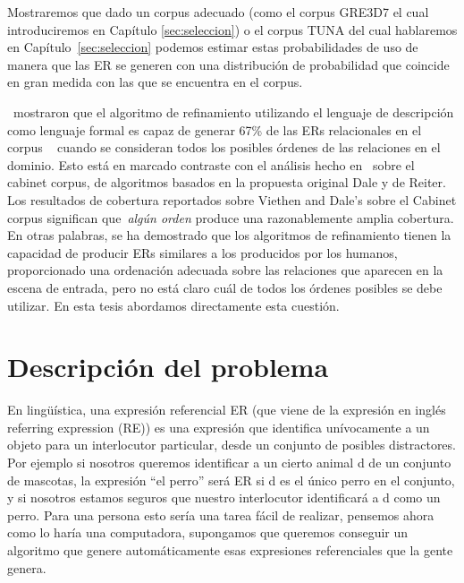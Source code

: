 Mostraremos que dado un corpus adecuado (como el corpus GRE3D7 el cual introduciremos en Cap\'itulo \ref{sec:seleccion}) o el corpus TUNA del cual hablaremos en Cap\'itulo~\ref{sec:seleccion} podemos estimar estas probabilidades de uso de manera que las ER se generen con una distribuci\'on de probabilidad que coincide en gran medida con las que se encuentra en el corpus.


\cite{arec2:2008:Areces}~mostraron que el algoritmo de refinamiento utilizando el lenguaje de descripci\'on \el como lenguaje formal es capaz de generar 67\% de
las ERs relacionales en el corpus ~\cite{viethen06:_algor_for_gener_refer_expres} cuando se consideran todos los posibles \'ordenes de las relaciones en el dominio. Esto est\'a en marcado contraste con el an\'alisis hecho en~\cite{viethen06:_algor_for_gener_refer_expres} sobre el cabinet corpus, de algoritmos basados en la propuesta original Dale y de Reiter.
Los resultados de cobertura reportados sobre Viethen and 
Dale's sobre el Cabinet corpus significan que~\emph{alg\'un orden} produce una razonablemente amplia cobertura. En otras palabras, se ha demostrado que los algoritmos de refinamiento tienen la capacidad de producir ERs similares a los producidos por los humanos, proporcionado una ordenaci\'on adecuada sobre las relaciones que aparecen
en la escena de entrada, pero no est\'a claro cu\'al de todos los \'ordenes posibles se debe utilizar. En esta tesis abordamos directamente esta cuesti\'on.

\section{Descripci\'on del problema}
\label{sec:problema}

En ling\"u\'{i}stica, una expresi\'on referencial ER (que viene de la expresi\'on en ingl\'es referring expression (RE)) es una expresi\'on que identifica un\'ivocamente a un objeto para un interlocutor particular, desde un conjunto de posibles distractores. Por ejemplo si nosotros queremos identificar a un cierto animal d de un conjunto de mascotas, la expresi\'on ``el perro'' ser\'a ER si d es el \'unico perro en el conjunto, y si nosotros estamos seguros que nuestro interlocutor identificar\'a a d como un perro. Para una persona esto ser\'ia una tarea f\'acil de realizar, pensemos ahora como lo har\'ia una computadora, supongamos que queremos conseguir un algoritmo que genere autom\'aticamente esas expresiones referenciales que la gente genera.\\



